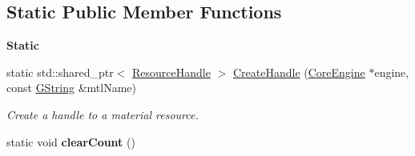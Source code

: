 \subsection*{Static Public Member Functions}
\begin{Indent}\textbf{ Static}\par
\begin{DoxyCompactItemize}
\item 
\mbox{\label{classrev_1_1_material_a1dece855f6362ea95e78934b4fe21333}} 
static std\+::shared\+\_\+ptr$<$ \mbox{\hyperlink{classrev_1_1_resource_handle}{Resource\+Handle}} $>$ \mbox{\hyperlink{classrev_1_1_material_a1dece855f6362ea95e78934b4fe21333}{Create\+Handle}} (\mbox{\hyperlink{classrev_1_1_core_engine}{Core\+Engine}} $\ast$engine, const \mbox{\hyperlink{classrev_1_1_g_string}{G\+String}} \&mtl\+Name)
\begin{DoxyCompactList}\small\item\em Create a handle to a material resource. \end{DoxyCompactList}\item 
\mbox{\label{classrev_1_1_material_a7c2ed02ca282ea9fe29f5a5b8a6bbe64}} 
static void {\bfseries clear\+Count} ()
\end{DoxyCompactItemize}
\end{Indent}
